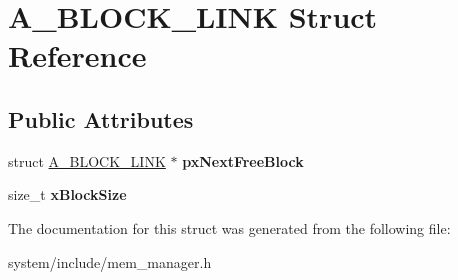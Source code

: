 \hypertarget{struct_a___b_l_o_c_k___l_i_n_k}{}\section{A\+\_\+\+B\+L\+O\+C\+K\+\_\+\+L\+I\+N\+K Struct Reference}
\label{struct_a___b_l_o_c_k___l_i_n_k}
\subsection*{Public Attributes}
\begin{DoxyCompactItemize}
\item 
\hypertarget{struct_a___b_l_o_c_k___l_i_n_k_a005de4303d4b4e61065e77d97c9774fe}{}struct \hyperlink{struct_a___b_l_o_c_k___l_i_n_k}{A\+\_\+\+B\+L\+O\+C\+K\+\_\+\+L\+I\+N\+K} $\ast$ {\bfseries px\+Next\+Free\+Block}\label{struct_a___b_l_o_c_k___l_i_n_k_a005de4303d4b4e61065e77d97c9774fe}

\item 
\hypertarget{struct_a___b_l_o_c_k___l_i_n_k_ad5dcf5df03d8be6186c567be9e2c657b}{}size\+\_\+t {\bfseries x\+Block\+Size}\label{struct_a___b_l_o_c_k___l_i_n_k_ad5dcf5df03d8be6186c567be9e2c657b}

\end{DoxyCompactItemize}


The documentation for this struct was generated from the following file\+:\begin{DoxyCompactItemize}
\item 
system/include/mem\+\_\+manager.\+h\end{DoxyCompactItemize}
